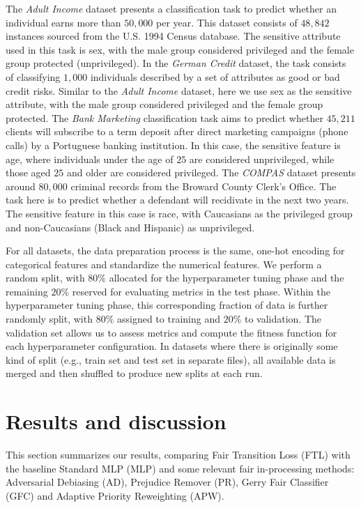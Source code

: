 The \textit{Adult Income} dataset presents a classification task to predict whether an individual earns more than $50,000$ per year. This dataset consists of $48,842$ instances sourced from the U.S. 1994 Census database. The sensitive attribute used in this task is sex, with the male group considered privileged and the female group protected (unprivileged). In the \textit{German Credit} dataset, the task consists of classifying $1,000$ individuals described by a set of attributes as good or bad credit risks. Similar to the \textit{Adult Income} dataset, here we use sex as the sensitive attribute, with the male group considered privileged and the female group protected. The \textit{Bank Marketing} classification task aims to predict whether $45,211$ clients will subscribe to a term deposit after direct marketing campaigns (phone calls) by a Portuguese banking institution. In this case, the sensitive feature is age, where individuals under the age of $25$ are considered unprivileged, while those aged $25$ and older are considered privileged. The \textit{COMPAS} dataset presents around $80,000$ criminal records from the Broward County Clerk’s Office. The task here is to predict whether a defendant will recidivate in the next two years. The sensitive feature in this case is race, with Caucasians as the privileged group and non-Caucasians (Black and Hispanic) as unprivileged.

For all datasets, the data preparation process is the same, one-hot encoding for categorical features and standardize the numerical features. We perform a random split, with $80\%$ allocated for the hyperparameter tuning phase and the remaining $20\%$ reserved for evaluating metrics in the test phase. Within the hyperparameter tuning phase, this corresponding fraction of data is further randomly split, with $80\%$ assigned to training and $20\%$ to validation. The validation set allows us to assess metrics and compute the fitness function for each hyperparameter configuration. In datasets where there is originally some kind of split (e.g., train set and test set in separate files), all available data is merged and then shuffled to produce new splits at each run.

\section{Results and discussion} \label{sec:results}

This section summarizes our results, comparing Fair Transition Loss (FTL) with the baseline Standard MLP (MLP) and some relevant fair in-processing methods: Adversarial Debiasing (AD), Prejudice Remover (PR), Gerry Fair Classifier (GFC) and Adaptive Priority Reweighting (APW).

